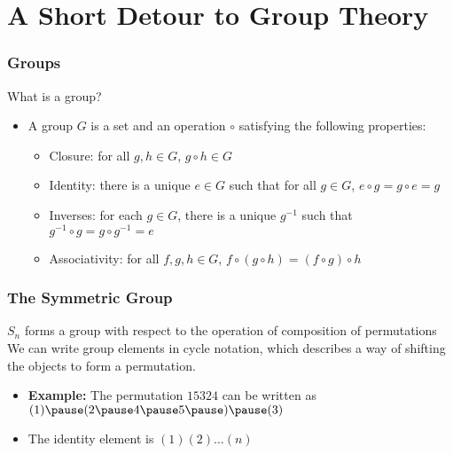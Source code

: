 \documentclass{beamer} %
\theoremstyle{definition} %
\def \pausenl {\pause $ \ $\\}
\begin{document}
\section{A Short Detour to Group Theory}

\begin{frame}
	
	\frametitle{Groups}
	
	What is a group?\\
	\pause
	\begin{itemize}
		\item A group $G$ is a set and an operation $\circ$ satisfying the following properties:\\
		\pause
		\begin{itemize}
			\item Closure: for all $g,h\in G$, $g\circ h\in G$
			\pause
			\item Identity: there is a unique $e\in G$ such that for all $g\in G$, $e\circ g = g \circ e = g$
			\pause
			\item Inverses: for each $g\in G$, there is a unique $g^{-1}$ such that $g^{-1}\circ g = g\circ g^{-1} = e$
			\pause 
			\item Associativity: for all $f,g,h\in G$, $f\circ(g\circ h) = (f\circ g)\circ h$
		\end{itemize}
		
		
		
		
	\end{itemize}
	\end{frame}
	\begin{frame}
		\frametitle{The Symmetric Group}
		
		$S_n$ forms a group with respect to the operation of composition of permutations\\
		
		\pausenl
		
		We can write group elements in \textup{cycle notation}, which describes a way of shifting the objects to form a permutation.\\
		
		\pausenl
		\begin{itemize}
			\item \textbf{Example:} The permutation $15324$ \pause can be written as $(1)\pause (2\pause 4 \pause 5 \pause)\pause (3)$
			\pause
			\item The identity element is $(1)(2)\dots (n)$
		\end{itemize}
	\end{frame}	
	
\end{document}

